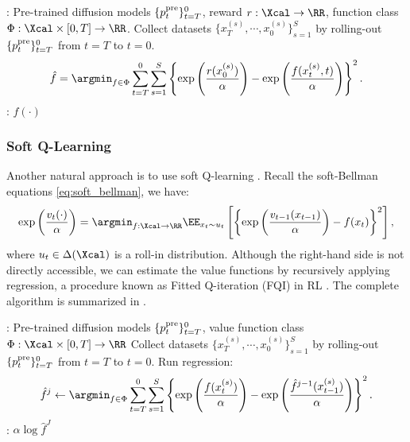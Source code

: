 \begin{algorithm}[!th]
\caption{Value Function Estimation using Monte Carlo Regression}\label{alg:MC}
\begin{algorithmic}[1]
     :  Pre-trained diffusion models $\{p^{\mathrm{pre}}_t\}^0_{t=T}$, reward $r:\Xcal \to \RR$, function class $\Phi: \Xcal  \times [0,T]\to \RR$.
    \STATE Collect datasets $\{x^{(s)}_{T},\cdots,x^{(s)}_0\}_{s=1}^S$ by rolling-out $\{ p^{\mathrm{pre}}_t\}_{t=T}^0$ from $t=T$ to $t=0$. 
    \STATE 
\begin{align*}
     \hat f = \argmin_{f \in \Phi}\sum_{t=T}^{0} \sum_{s=1}^S \left \{\exp\left (\frac{r(x^{(s)}_0)}{\alpha} \right) - \exp \left ( \frac{f(x^{(s)}_t, t)}{\alpha}\right) \right \}^2. 
\end{align*}
      : $\hat f(\cdot)$
\end{algorithmic}
\end{algorithm}



\subsubsection{Soft Q-Learning}

Another natural approach is to use soft Q-learning \citep{haarnoja2017reinforcement,levine2018reinforcement}. Recall the soft-Bellman equations \eqref{eq:soft_bellman}, we have:
\begin{align*}
    \exp\left (\frac{v_t(\cdot)}{\alpha} \right ) =\argmin_{f:\Xcal \to \RR}\EE_{x_t \sim u_t} \left [\left \{\exp\left (\frac{v_{t-1}(x_{t-1})}{\alpha} \right )-f(x_t) \right \}^2 \right], 
\end{align*}
where $u_t \in \Delta(\Xcal)$ is a roll-in distribution. Although the right-hand side is not directly accessible, we can estimate the value functions by recursively applying regression, a procedure known as Fitted Q-iteration (FQI) in RL \citep{ernst2005tree,mnih2015human}. The complete algorithm is summarized in .

\begin{algorithm}[!ht]
\caption{Value Function Estimation using Soft Q-learning}\label{alg:FQI}
\begin{algorithmic}[1]
     :  Pre-trained diffusion models $\{p^{\mathrm{pre}}_t\}^0_{t=T}$, value function class $\Phi:\Xcal \times [0,T] \to \RR$
    \STATE Collect datasets $\{x^{(s)}_{T},\cdots,x^{(s)}_0\}_{s=1}^S$ by rolling-out $\{ p^{\mathrm{pre}}_t\}_{t=T}^0$ from $t=T$ to $t=0$. 
    \STATE  Run regression:  
    \begin{align*}
          \hat f^{j} \leftarrow \argmin_{f \in \Phi}\sum_{t=T}^{0} \sum_{s=1}^S \left \{ \exp\left( \frac{f (x^{(s)}_t)}{\alpha} \right ) - \exp\left (\frac{ \hat f^{j-1}(x^{(s)}_{t-1})}{\alpha}\right ) \right \}^2.
    \end{align*}
     \ENDFOR  
      :  $\alpha \log \hat f^{J}$ 
\end{algorithmic}
\end{algorithm}
